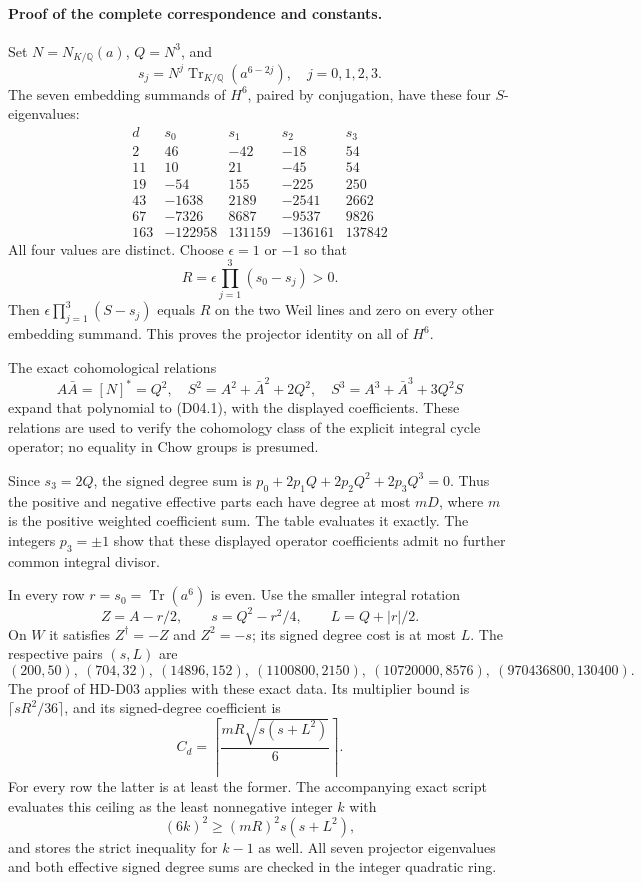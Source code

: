 \paragraph{Proof of the complete correspondence and constants.}
Set \(N=N_{K/\mathbb Q}(a)\), \(Q=N^3\), and
\[
 s_j=N^j\operatorname{Tr}_{K/\mathbb Q}(a^{6-2j}),
 \quad j=0,1,2,3.
\]
The seven embedding summands of \(H^6\), paired by conjugation,
have these four \(S\)-eigenvalues:
\[
\begin{array}{c|r|r|r|r}
d&s_0&s_1&s_2&s_3\\\hline
2&46&-42&-18&54\\
11&10&21&-45&54\\
19&-54&155&-225&250\\
43&-1638&2189&-2541&2662\\
67&-7326&8687&-9537&9826\\
163&-122958&131159&-136161&137842
\end{array}
\]
All four values are distinct. Choose \(\epsilon=1\) or \(-1\)
so that
\[
 R=\epsilon\prod_{j=1}^3(s_0-s_j)>0.
\]
Then \(\epsilon\prod_{j=1}^3(S-s_j)\) equals \(R\) on the
two Weil lines and zero on every other embedding summand.
This proves the projector identity on all of \(H^6\).

The exact cohomological relations
\[
 A\bar A=[N]^*=Q^2,\quad
 S^2=A^2+\bar A^2+2Q^2,\quad
 S^3=A^3+\bar A^3+3Q^2S
\]
expand that polynomial to (D04.1), with the displayed
coefficients. These relations are used to verify the
cohomology class of the explicit integral cycle operator;
no equality in Chow groups is presumed.

Since \(s_3=2Q\), the signed degree sum is
\(p_0+2p_1Q+2p_2Q^2+2p_3Q^3=0\).
Thus the positive and negative effective parts each have
degree at most \(mD\), where \(m\) is the positive weighted
coefficient sum. The table evaluates it exactly.
The integers \(p_3=\pm1\) show that these displayed operator
coefficients admit no further common integral divisor.

In every row \(r=s_0=\operatorname{Tr}(a^6)\) is even.
Use the smaller integral rotation
\[
 Z=A-r/2,\qquad
 s=Q^2-r^2/4,\qquad L=Q+|r|/2.
\]
On \(W\) it satisfies \(Z^\dagger=-Z\) and \(Z^2=-s\);
its signed degree cost is at most \(L\).
The respective pairs \((s,L)\) are
\[
 (200,50),\ (704,32),\ (14896,152),\
 (1100800,2150),\ (10720000,8576),\
 (970436800,130400).
\]
The proof of HD-D03 applies with these exact data. Its
multiplier bound is
\(\lceil sR^2/36\rceil\), and its signed-degree coefficient is
\[
 C_d=\left\lceil\frac{mR\sqrt{s(s+L^2)}}6\right\rceil.
\]
For every row the latter is at least the former.
The accompanying exact script evaluates this ceiling as the
least nonnegative integer \(k\) with
\[
 (6k)^2\ge(mR)^2s(s+L^2),
\]
and stores the strict inequality for \(k-1\) as well.
All seven projector eigenvalues and both effective signed
degree sums are checked in the integer quadratic ring.


